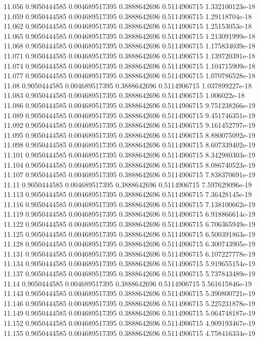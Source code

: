 {11.056 0.9050444585 0.004689517395 0.3888642696 0.5114906715 1.332100123e-18
11.059 0.9050444585 0.004689517395 0.3888642696 0.5114906715 1.29118704e-18
11.062 0.9050444585 0.004689517395 0.3888642696 0.5114906715 1.25153053e-18
11.065 0.9050444585 0.004689517395 0.3888642696 0.5114906715 1.213091999e-18
11.068 0.9050444585 0.004689517395 0.3888642696 0.5114906715 1.175834039e-18
11.071 0.9050444585 0.004689517395 0.3888642696 0.5114906715 1.139720391e-18
11.074 0.9050444585 0.004689517395 0.3888642696 0.5114906715 1.104715909e-18
11.077 0.9050444585 0.004689517395 0.3888642696 0.5114906715 1.070786528e-18
11.08 0.9050444585 0.004689517395 0.3888642696 0.5114906715 1.037899227e-18
11.083 0.9050444585 0.004689517395 0.3888642696 0.5114906715 1.006022e-18
11.086 0.9050444585 0.004689517395 0.3888642696 0.5114906715 9.751238266e-19
11.089 0.9050444585 0.004689517395 0.3888642696 0.5114906715 9.451746351e-19
11.092 0.9050444585 0.004689517395 0.3888642696 0.5114906715 9.161452797e-19
11.095 0.9050444585 0.004689517395 0.3888642696 0.5114906715 8.880075092e-19
11.098 0.9050444585 0.004689517395 0.3888642696 0.5114906715 8.607339402e-19
11.101 0.9050444585 0.004689517395 0.3888642696 0.5114906715 8.342980303e-19
11.104 0.9050444585 0.004689517395 0.3888642696 0.5114906715 8.086740523e-19
11.107 0.9050444585 0.004689517395 0.3888642696 0.5114906715 7.838370691e-19
11.11 0.9050444585 0.004689517395 0.3888642696 0.5114906715 7.597629096e-19
11.113 0.9050444585 0.004689517395 0.3888642696 0.5114906715 7.36428145e-19
11.116 0.9050444585 0.004689517395 0.3888642696 0.5114906715 7.138100662e-19
11.119 0.9050444585 0.004689517395 0.3888642696 0.5114906715 6.918866614e-19
11.122 0.9050444585 0.004689517395 0.3888642696 0.5114906715 6.706365949e-19
11.125 0.9050444585 0.004689517395 0.3888642696 0.5114906715 6.500391863e-19
11.128 0.9050444585 0.004689517395 0.3888642696 0.5114906715 6.300743905e-19
11.131 0.9050444585 0.004689517395 0.3888642696 0.5114906715 6.107227778e-19
11.134 0.9050444585 0.004689517395 0.3888642696 0.5114906715 5.919655154e-19
11.137 0.9050444585 0.004689517395 0.3888642696 0.5114906715 5.737843489e-19
11.14 0.9050444585 0.004689517395 0.3888642696 0.5114906715 5.561615846e-19
11.143 0.9050444585 0.004689517395 0.3888642696 0.5114906715 5.390800721e-19
11.146 0.9050444585 0.004689517395 0.3888642696 0.5114906715 5.225231878e-19
11.149 0.9050444585 0.004689517395 0.3888642696 0.5114906715 5.064748187e-19
11.152 0.9050444585 0.004689517395 0.3888642696 0.5114906715 4.909193467e-19
11.155 0.9050444585 0.004689517395 0.3888642696 0.5114906715 4.758416334e-19
}
